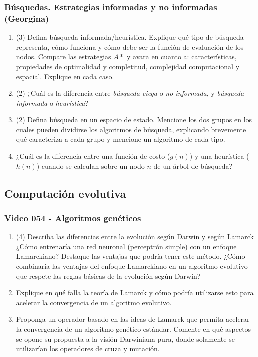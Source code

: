 \documentclass[a4paper,10pt,spanish]{article}
\begin{document}
\subsubsection{Búsquedas. Estrategias informadas y no informadas (Georgina)}

\begin{enumerate}
\item (3) Defina búsqueda informada/heurística. Explique qué tipo de búsqueda representa, cómo funciona y cómo debe ser la función de evaluación de los nodos. Compare las estrategias $A*$ y avara en cuanto a: características, propiedades de optimalidad y completitud, complejidad computacional y espacial. Explique en cada caso.

\item (2) ¿Cuál es la diferencia entre \textit{búsqueda ciega} o \textit{no informada}, y \textit{búsqueda informada} o \textit{heurística}?

\item (2) Defina búsqueda en un espacio de estado. Mencione los dos grupos en los cuales pueden dividirse los algoritmos de búsqueda, explicando brevemente qué caracteriza a cada grupo y mencione un algoritmo de cada tipo.

\item ¿Cuál es la diferencia entre una función de costo ($g(n)$) y una heurística ($h(n)$) cuando se calculan sobre un nodo $n$ de un árbol de búsqueda?
\end{enumerate}

\subsection{Computación evolutiva}

\subsubsection{Video 054 - Algoritmos genéticos}

\begin{enumerate}
\item (4) Describa las diferencias entre la evolución según Darwin y según Lamarck ¿Cómo entrenaría una red neuronal (perceptrón simple) con un enfoque Lamarckiano? Destaque las ventajas que podría tener este método. ¿Cómo combinaría las ventajas del enfoque Lamarckiano en un algoritmo evolutivo que respete las reglas básicas de la evolución según Darwin?

\item Explique en qué falla la teoría de Lamarck y cómo podría utilizarse esto para acelerar la convergencia de un algoritmo evolutivo.

\item Proponga un operador basado en las ideas de Lamarck que permita acelerar la convergencia de un algoritmo genético estándar. Comente en qué aspectos se opone su propuesta a la visión Darwiniana pura, donde solamente se utilizarían los operadores de cruza y mutación.
\end{enumerate}
\end{document}

